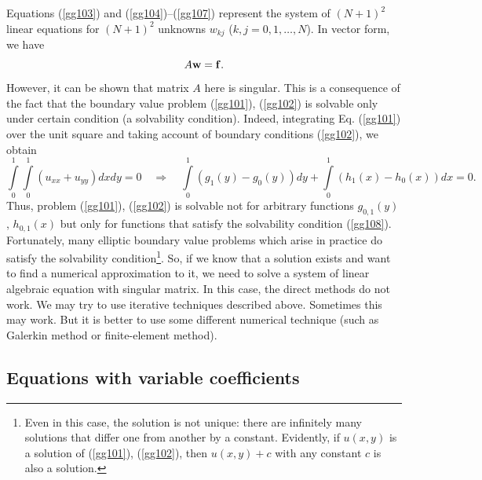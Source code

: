 Equations (\ref{gg103}) and (\ref{gg104})--(\ref{gg107}) represent the system of $(N+1)^2$
linear equations for $(N+1)^2$ unknowns $w_{kj}$ ($k,j=0,1,\dots,N$).
In vector form, we have
\[
A{\bf w}={\bf f}.
\]
However, it can be shown that matrix $A$ here is singular. This is a consequence of the fact
that the boundary value problem (\ref{gg101}), (\ref{gg102}) is solvable only under certain
condition (a solvability condition). Indeed, integrating Eq. (\ref{gg101}) over the unit square
and taking account of boundary conditions (\ref{gg102}), we obtain
\begin{equation}
\int\limits_{0}^{1}\int\limits_{0}^{1}
\left(u_{xx}+u_{yy}\right)dxdy=0 \quad \Rightarrow \quad
\int\limits_{0}^{1}(g_{1}(y)-g_{0}(y))dy+
\int\limits_{0}^{1}(h_{1}(x)-h_{0}(x))dx=0. \label{gg108}
\end{equation}
Thus, problem (\ref{gg101}), (\ref{gg102}) is solvable not for arbitrary functions
$g_{0,1}(y)$, $h_{0,1}(x)$ but only for functions that satisfy the solvability
condition (\ref{gg108}). Fortunately, many elliptic boundary value problems which
arise in practice do satisfy the solvability condition\footnote{Even in this case, the solution
is not unique: there are infinitely many solutions that differ one from another by a constant. Evidently,
if $u(x,y)$ is a solution of (\ref{gg101}), (\ref{gg102}), then $u(x,y)+c$ with any constant $c$ is also
a solution.}. So, if we know that a solution exists and want to find a numerical approximation to it,
we need to solve a system of linear algebraic equation with singular matrix. In this case, the direct methods
do not work. We may try to use iterative techniques described above. Sometimes this may work. But it is better
to use some different numerical technique (such as Galerkin method or finite-element method).




\subsection{Equations with variable coefficients}

